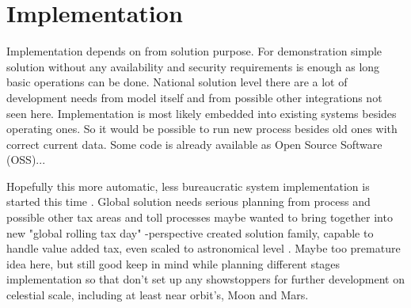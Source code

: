 %
%
%
\chapter{Implementation}
\label{implementation}

Implementation depends on from solution purpose. For demonstration simple
solution without any availability and security requirements is enough as long
basic operations can be done. National solution level there are a lot of
development needs from model itself and from possible other integrations not
seen here. Implementation is most likely embedded into existing systems
besides operating ones. So it would be possible to run new process besides old
ones with correct current data. Some code is already available as Open Source
Software (OSS)\allowbreak\cite{FSFE_PublicCode}\allowbreak\cite{DayTax}...

Hopefully this more automatic, less bureaucratic system implementation is
started this time \cite{BasicIncomeInit}\allowbreak\cite{
 LiberaPerustili}\allowbreak\cite{A2PalkkaerotIlta}\allowbreak\cite{
 UniversalCredit}\allowbreak\cite{UniversalBasicIncome}. Global solution needs
serious planning from process and possible other tax areas and toll processes
maybe wanted to bring together into new "global rolling tax day" -perspective
created solution family, capable to handle value added tax, even scaled to
astronomical level \cite{LTEonMoon}. Maybe too premature idea here, but still
good keep in mind while planning different stages implementation so that don't
set up any showstoppers for further development on celestial scale, including
at least near orbit's, Moon and Mars.

